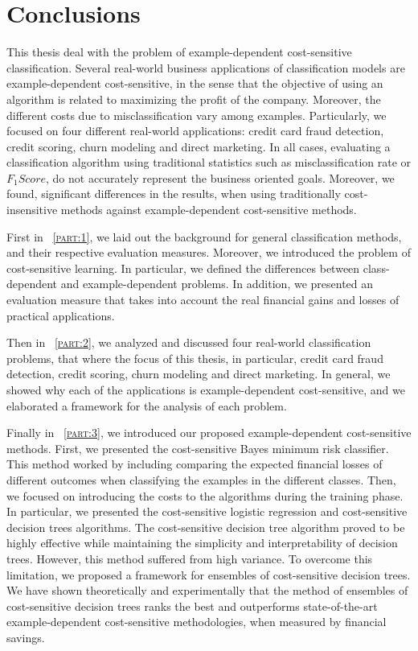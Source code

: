 \chapter{Conclusions}\label{ch:10}

This thesis deal with the problem of example-dependent cost-sensitive classification.
Several real-world business applications of classification models are example-dependent 
cost-sensitive, in the sense that the objective of using an algorithm is related to maximizing the 
profit of the company. Moreover, the different costs due to misclassification vary among examples. 
Particularly, we focused on four different real-world applications: credit card fraud 
detection, credit scoring, churn modeling and direct marketing. In all cases, evaluating a 
classification algorithm using traditional statistics such as misclassification rate or $F_1Score$, 
do not accurately represent the business oriented goals. Moreover, we found, significant 
differences in the results, when using traditionally cost-insensitive methods against 
example-dependent cost-sensitive methods.

First in \partname{~\textsc{\ref{part:1}}}, we laid out the background for general classification 
methods, and their respective evaluation measures. Moreover, we introduced the problem of 
cost-sensitive learning. In particular, we defined the differences between class-dependent and 
example-dependent problems. In addition, we presented an evaluation measure that takes into account 
the real financial gains and losses of practical applications.

Then in \partname{~\textsc{\ref{part:2}}}, we analyzed and discussed four real-world 
classification problems, that where the focus of this thesis, in particular, credit card fraud 
detection, credit scoring, churn modeling and direct marketing. In general, we showed why each of 
the applications is example-dependent cost-sensitive, and we elaborated a framework for the 
analysis of each problem. 

Finally in \partname{~\textsc{\ref{part:3}}}, we introduced our proposed example-dependent 
cost-sensitive methods. First, we presented the cost-sensitive Bayes minimum risk classifier. This 
method worked by including comparing the expected financial losses of different outcomes when 
classifying the examples in the different classes. Then, we focused on introducing the costs to the 
algorithms during the training phase. In particular, we presented the cost-sensitive logistic 
regression and cost-sensitive decision trees algorithms. The cost-sensitive decision tree algorithm 
proved to be highly effective while maintaining the simplicity and interpretability of decision 
trees. However, this method suffered from high variance. To overcome this limitation, we proposed 
a framework for ensembles of cost-sensitive decision trees. We have shown theoretically and 
experimentally that the method of ensembles of cost-sensitive decision trees ranks the best and 
outperforms state-of-the-art example-dependent cost-sensitive methodologies, when measured by 
financial savings.

